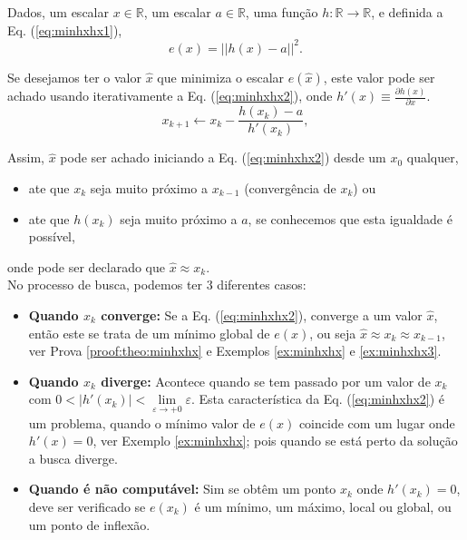 \begin{theorem}\label{theo:minhxhx}
Dados,
um escalar $x \in \mathbb{R}$, 
um escalar $a \in \mathbb{R}$,  
uma função $h:\mathbb{R} \rightarrow \mathbb{R}$, e 
definida a Eq. (\ref{eq:minhxhx1}),
\begin{equation}\label{eq:minhxhx1}
e(x)=||h(x)-a||^2.
\end{equation}

Se desejamos ter o valor $\hat{x}$ que minimiza o escalar $e(\hat{x})$,
este valor pode ser achado usando iterativamente a Eq. (\ref{eq:minhxhx2}),
onde  $h'(x)\equiv \frac{\partial h(x)}{\partial x}$.
\begin{equation}\label{eq:minhxhx2}
x_{k+1} \leftarrow x_k-
\frac{ h(x_k)-a}{h'(x_k)},
\end{equation}


Assim, $\hat{x}$ pode ser achado iniciando a Eq. (\ref{eq:minhxhx2}) desde um 
$x_{0}$ qualquer, 
\begin{itemize}
    \item ate que $x_{k}$ seja muito próximo a $x_{k-1}$ (convergência de $x_{k}$) ou
    \item ate que $h(x_{k})$ seja muito próximo a $a$, 
    se conhecemos que esta igualdade é possível,
\end{itemize}
onde pode ser declarado que $\hat{x} \approx x_{k}$.\\

No processo de busca, podemos ter 3 diferentes casos:
\begin{itemize}
\item \textbf{Quando $x_{k}$ converge:}  
Se a Eq. (\ref{eq:minhxhx2}),  converge a um valor $\hat{x}$, então este se trata de 
um mínimo global de
$e(x)$, ou seja $\hat{x}\approx x_k\approx x_{k-1}$, ver Prova \ref{proof:theo:minhxhx} e Exemplos \ref{ex:minhxhx} e \ref{ex:minhxhx3}.

\item \textbf{Quando $x_{k}$ diverge:}  
Acontece quando se tem passado por
um valor de $x_k$ com $0 <|h'(x_k) | < \lim\limits_{\varepsilon \rightarrow +0}\varepsilon$. 
Esta característica da Eq. (\ref{eq:minhxhx2}) é um problema, quando o mínimo valor de $e(x)$ coincide
com um lugar onde $h'(x) = 0$, ver Exemplo \ref{ex:minhxhx}; pois quando se está perto
da solução a busca diverge.

\item \textbf{Quando é não computável:} 
Sim se obtêm um ponto $x_k$ onde $h'(x_k) = 0$,
deve ser verificado se $e(x_k)$ é um mínimo, um
máximo, local ou global, ou um ponto de inflexão. \\
\end{itemize}


\end{theorem}
